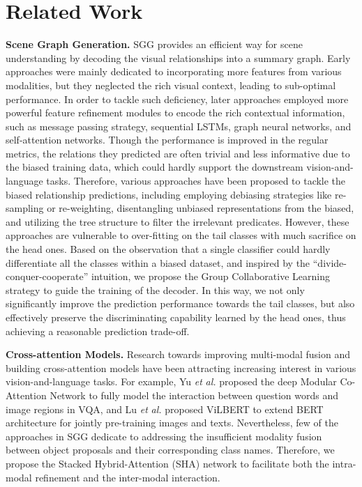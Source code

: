 \documentclass[10pt,twocolumn,letterpaper]{article}
\begin{document}
\section{Related Work}
\noindent\textbf{Scene Graph Generation.}
SGG provides an efficient way for scene understanding by decoding the visual relationships into a summary graph. Early approaches\cite{lu2016visual,dai2017detecting,liang2018visual,liao2019natural} were mainly dedicated to incorporating more features from various modalities, but they neglected the rich visual context, leading to sub-optimal performance. In order to tackle such deficiency, later approaches employed more powerful feature refinement modules to encode the rich contextual information, such as message passing strategy\cite{xu2017scene,li2021bipartite}, sequential LSTMs\cite{zellers2018neural,tang2019learning}, graph neural networks\cite{chen2019knowledge,zareian2020bridging}, and self-attention networks\cite{lin2020gps,sharifzadeh2020classification}. Though the performance is improved in the regular metrics, the relations they predicted are often trivial and less informative due to the biased training data, which could hardly support the downstream vision-and-language tasks. Therefore, various approaches\cite{suhail2021energy, chiou2021recovering, wen2020unbiased} have been proposed to tackle the biased relationship predictions, including employing debiasing strategies like re-sampling\cite{li2021bipartite} or re-weighting\cite{yan2020pcpl}, disentangling unbiased representations from the biased\cite{tang2020unbiased}, and utilizing the tree structure to filter the irrelevant predicates\cite{yu2020cogtree}. 
However, these approaches are vulnerable to over-fitting on the tail classes with much sacrifice on the head ones. Based on the observation that a single classifier could hardly differentiate all the classes within a biased dataset, and inspired by the ``divide-conquer-cooperate'' intuition, we propose the Group Collaborative Learning strategy to guide the training of the decoder. In this way, we not only significantly improve the prediction performance towards the tail classes, but also effectively preserve the discriminating capability learned by the head ones, thus achieving a reasonable prediction trade-off. 


\noindent\textbf{Cross-attention Models.} Research towards improving multi-modal fusion\cite{wei2019neural, wei2019mmgcn} and building cross-attention models\cite{zheng2021deep,wiles2021co} have been attracting increasing interest in various vision-and-language tasks. For example, Yu \textit{et} \textit{al.}\cite{yu2019deep} proposed the deep Modular Co-Attention Network to fully model the interaction between question words and image regions in VQA, and Lu \textit{et} \textit{al.}\cite{lu2019vilbert} proposed ViLBERT to extend BERT architecture for jointly pre-training images and texts. Nevertheless, few of the approaches in SGG dedicate to addressing the insufficient modality fusion between object proposals and their corresponding class names. Therefore, we propose the Stacked Hybrid-Attention (SHA) network to facilitate both the intra-modal refinement and the inter-modal interaction.
\end{document}
